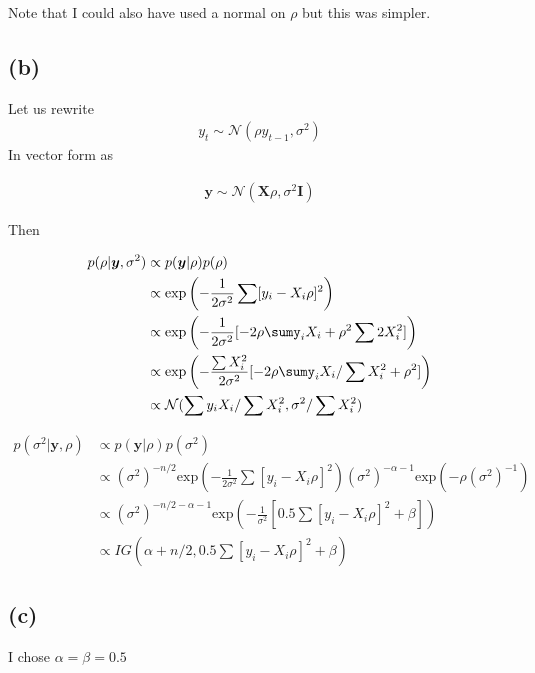 \documentclass[11pt]{article}
\begin{document}
Note that I could also have used a normal on $\rho$ but this was simpler.

\subsection*{(b)}
Let us rewrite 
\begin{align*}
    y_t \sim \mathcal{N}(\rho y_{t-1}, \sigma^2)
\end{align*}
In vector form as

\begin{align*}
    \boldsymbol{y} \sim \mathcal{N}(\boldsymbol{X}\rho , \sigma^2\boldsymbol{I})
\end{align*}

Then

\begin{align*}
    p(\rho|\boldsymbol{y}, \sigma^2) &\propto p(\boldsymbol{y}|\rho)p(\rho)\\
    & \propto\text{exp} \left( -\frac{1}{2\sigma^2} \sum [y_i-X_i\rho]^2\right)\\
      & \propto\text{exp} \left( -\frac{1}{2\sigma^2} [-2\rho\sumy_iX_i + \rho^2\sum2X_i^2]\right)\\
      & \propto\text{exp} \left( -\frac{\sum X_i^2}{2\sigma^2} [-2\rho\sumy_iX_i/\sum X_i^2 + \rho^2]\right)\\
      & \propto \mathcal{N}(\sum y_i X_i / \sum X_i^2, \sigma^2/\sum X_i^2)
\end{align*}

\begin{align*}
    p(\sigma^2|\boldsymbol{y}, \rho) &\propto p(\boldsymbol{y}|\rho)p(\sigma^2)\\
    &  \propto (\sigma^2)^{-n/2}\text{exp} \left( -\frac{1}{2\sigma^2} \sum [y_i-X_i\rho]^2\right) (\sigma^2)^{-\alpha-1} \text{exp}(-\rho(\sigma^2)^{-1})\\
    &  \propto (\sigma^2)^{-n/2-\alpha-1}\text{exp} \left( -\frac{1}{\sigma^2} [0.5\sum [y_i-X_i\rho]^2 + \beta]\right)\\
    & \propto IG(\alpha + n/2, 0.5\sum [y_i-X_i\rho]^2 + \beta)
\end{align*}

\subsection*{(c)}
I chose $\alpha=\beta=0.5$
\end{document}

